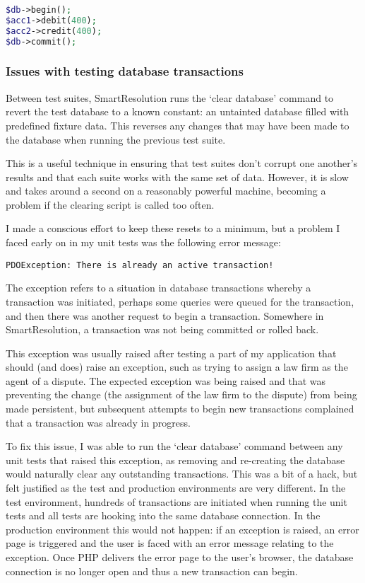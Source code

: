 \begin{lstlisting}[language=php]
$db->begin();
$acc1->debit(400);
$acc2->credit(400);
$db->commit();
\end{lstlisting}

\subsubsection{Issues with testing database transactions}

Between test suites, SmartResolution runs the `clear database' command to revert the test database to a known constant: an untainted database filled with predefined fixture data. This reverses any changes that may have been made to the database when running the previous test suite.

This is a useful technique in ensuring that test suites don't corrupt one another's results and that each suite works with the same set of data. However, it is slow and takes around a second on a reasonably powerful machine, becoming a problem if the clearing script is called too often.

I made a conscious effort to keep these resets to a minimum, but a problem I faced early on in my unit tests was the following error message:

\begin{lstlisting}
PDOException: There is already an active transaction!
\end{lstlisting}

The exception refers to a situation in database transactions whereby a transaction was initiated, perhaps some queries were queued for the transaction, and then there was another request to begin a transaction. Somewhere in SmartResolution, a transaction was not being committed or rolled back.

This exception was usually raised after testing a part of my application that should (and does) raise an exception, such as trying to assign a law firm as the agent of a dispute. The expected exception was being raised and that was preventing the change (the assignment of the law firm to the dispute) from being made persistent, but subsequent attempts to begin new transactions complained that a transaction was already in progress.

To fix this issue, I was able to run the `clear database' command between any unit tests that raised this exception, as removing and re-creating the database would naturally clear any outstanding transactions. This was a bit of a hack, but felt justified as the test and production environments are very different. In the test environment, hundreds of transactions are initiated when running the unit tests and all tests are hooking into the same database connection. In the production environment this would not happen: if an exception is raised, an error page is triggered and the user is faced with an error message relating to the exception. Once PHP delivers the error page to the user's browser, the database connection is no longer open and thus a new transaction can begin.

